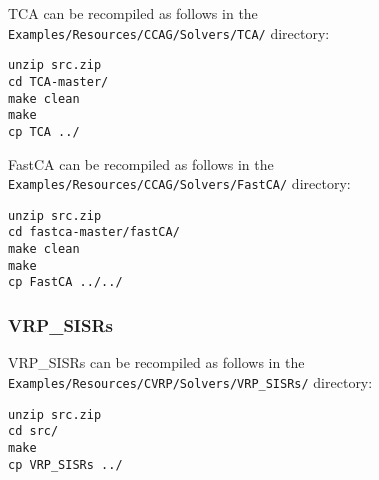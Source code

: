 \documentclass{article}
\begin{document}
TCA can be recompiled as follows in the \texttt{Examples/Resources/CCAG/Solvers/TCA/} directory:
\begin{Verbatim}[frame=single]
unzip src.zip
cd TCA-master/
make clean
make
cp TCA ../
\end{Verbatim}

FastCA can be recompiled as follows in the \texttt{Examples/Resources/CCAG/Solvers/FastCA/} directory:
\begin{Verbatim}[frame=single]
unzip src.zip
cd fastca-master/fastCA/
make clean
make
cp FastCA ../../
\end{Verbatim}

\subsubsection{VRP\_SISRs}
VRP\_SISRs can be recompiled as follows in the \texttt{Examples/Resources/CVRP/Solvers/VRP\_SISRs/} directory:
\begin{Verbatim}[frame=single]
unzip src.zip
cd src/
make
cp VRP_SISRs ../
\end{Verbatim}
\end{document}
